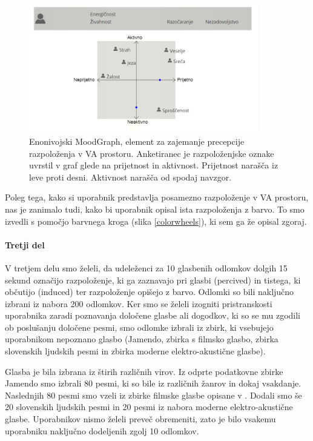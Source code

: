 \documentclass[a4paper, 12pt]{book}
\begin{document}
{\begin{figure}[ht]
\centering
\includegraphics[width=10cm]{images/enomoodgraph.png}

\caption{Enonivojski MoodGraph, element za zajemanje precepcije razpoloženja v VA prostoru. Anketiranec je razpoloženjske oznake uvrstil v graf glede na prijetnost in aktivnost. Prijetnost narašča iz leve proti desni. Aktivnost narašča od spodaj navzgor. }
\label{moodgraph}
\end{figure}

Poleg tega, kako si uporabnik predstavlja posamezno razpoloženje v VA prostoru, nas je zanimalo tudi, kako bi uporabnik opisal ista razpoloženja z barvo. To smo izvedli s pomočjo barvnega kroga (slika \ref{colorwheels}), ki sem ga že opisal zgoraj. 

\paragraph{Tretji del}

V tretjem delu smo želeli, da udeleženci za 10 glasbenih odlomkov dolgih 15 sekund označijo razpoloženje, ki ga zaznavajo pri glasbi (percived) in tistega, ki občutijo (induced) ter razpoloženje opišejo z barvo. Odlomki so bili naključno izbrani iz nabora 200 odlomkov. Ker smo se želeli izogniti pristranskosti uporabnika zaradi poznavanja določene glasbe ali dogodkov, ki so se mu zgodili ob poslušanju določene pesmi, smo odlomke izbrali iz zbirk, ki vsebujejo uporabnikom nepoznano glasbo (Jamendo, zbirka s filmsko glasbo, zbirka slovenskih ljudskih pesmi in zbirka moderne elektro-akustične glasbe).  

Glasba je bila izbrana iz štirih različnih virov. Iz odprte podatkovne zbirke Jamendo smo izbrali 80 pesmi, ki so bile iz različnih žanrov in dokaj vsakdanje. Naslednjih 80 pesmi smo vzeli iz zbirke filmske glasbe opisane v \cite{Eerola2010}. Dodali smo še 20 slovenskih ljudskih pesmi in 20 pesmi iz nabora moderne elektro-akustične glasbe. Uporabnikov nismo želeli preveč obremeniti, zato je bilo vsakemu uporabniku naključno dodeljenih zgolj 10 odlomkov.

}
\end{document}
